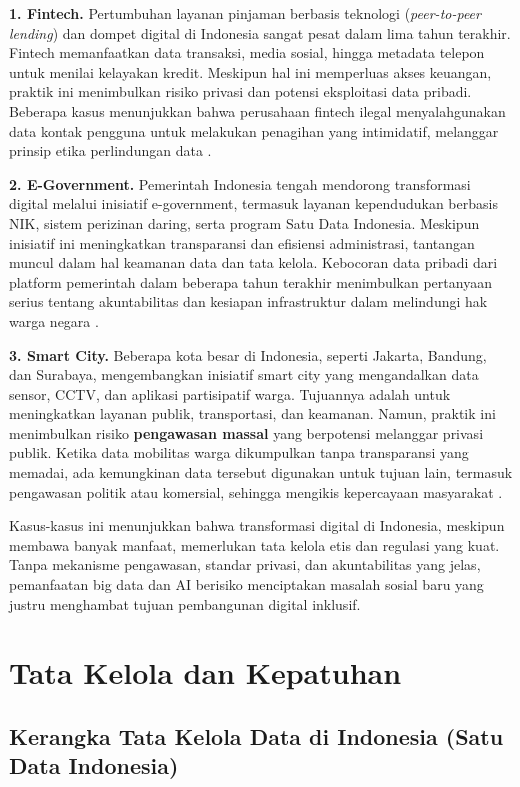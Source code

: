 \textbf{1. Fintech.}  
Pertumbuhan layanan pinjaman berbasis teknologi (\textit{peer-to-peer lending}) dan dompet digital di Indonesia sangat pesat dalam lima tahun terakhir. Fintech memanfaatkan data transaksi, media sosial, hingga metadata telepon untuk menilai kelayakan kredit. Meskipun hal ini memperluas akses keuangan, praktik ini menimbulkan risiko privasi dan potensi eksploitasi data pribadi. Beberapa kasus menunjukkan bahwa perusahaan fintech ilegal menyalahgunakan data kontak pengguna untuk melakukan penagihan yang intimidatif, melanggar prinsip etika perlindungan data \cite{ojk2017}.  

\textbf{2. E-Government.}  
Pemerintah Indonesia tengah mendorong transformasi digital melalui inisiatif e-government, termasuk layanan kependudukan berbasis NIK, sistem perizinan daring, serta program Satu Data Indonesia. Meskipun inisiatif ini meningkatkan transparansi dan efisiensi administrasi, tantangan muncul dalam hal keamanan data dan tata kelola. Kebocoran data pribadi dari platform pemerintah dalam beberapa tahun terakhir menimbulkan pertanyaan serius tentang akuntabilitas dan kesiapan infrastruktur dalam melindungi hak warga negara \cite{pdp2022}.  

\textbf{3. Smart City.}  
Beberapa kota besar di Indonesia, seperti Jakarta, Bandung, dan Surabaya, mengembangkan inisiatif smart city yang mengandalkan data sensor, CCTV, dan aplikasi partisipatif warga. Tujuannya adalah untuk meningkatkan layanan publik, transportasi, dan keamanan. Namun, praktik ini menimbulkan risiko \textbf{pengawasan massal} yang berpotensi melanggar privasi publik. Ketika data mobilitas warga dikumpulkan tanpa transparansi yang memadai, ada kemungkinan data tersebut digunakan untuk tujuan lain, termasuk pengawasan politik atau komersial, sehingga mengikis kepercayaan masyarakat \cite{cath2018governing}.  

Kasus-kasus ini menunjukkan bahwa transformasi digital di Indonesia, meskipun membawa banyak manfaat, memerlukan tata kelola etis dan regulasi yang kuat. Tanpa mekanisme pengawasan, standar privasi, dan akuntabilitas yang jelas, pemanfaatan big data dan AI berisiko menciptakan masalah sosial baru yang justru menghambat tujuan pembangunan digital inklusif.


\section{Tata Kelola dan Kepatuhan}

\subsection{Kerangka Tata Kelola Data di Indonesia (Satu Data Indonesia)}


